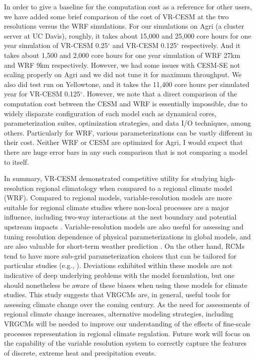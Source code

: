 \documentclass[draft,ms]{agutex}   %
\begin{document}
\begin{article}
In order to give a baseline for the computation cost as a reference for other users, we have added some brief comparison of the cost of VR-CESM at the two resolutions versus the WRF simulations. For our simulations on Agri (a cluster server at UC Davis), roughly, it takes about 15,000 and 25,000 core hours for one year simulation of VR-CESM 0.25$^\circ$ and VR-CESM 0.125$^\circ$ respectively. And it takes about 1,500 and 2,000 core hours for one year simulation of WRF 27km and WRF 9km respectively. However, we had some issues with CESM-SE not scaling properly on Agri and we did not tune it for maximum throughput. We also did test run on Yellowtone, and it takes the 11,400 core hours per simulated year for VR-CESM 0.125$^\circ$. However, we note that a direct comparison of the computation cost between the CESM and WRF is essentially impossible, due to widely disparate configuration of each model such as dynamical cores, parameterization suites, optimization strategies, and data I/O techniques, among others. Particularly for WRF, various parameterizations can be vastly different in their cost. Neither WRF or CESM are optimized for Agri, I would expect that there are huge error bars in any such comparison that is not comparing a model to itself.

In summary, VR-CESM demonstrated competitive utility for studying high-resolution regional climatology when compared to a regional climate model (WRF). Compared to regional models, variable-resolution models are more suitable for regional climate studies where non-local processes are a major influence, including two-way interactions at the nest boundary and potential upstream impacts \citep{sakaguchi2015exploring}.  Variable-resolution models are also useful for assessing and tuning resolution dependence of physical parameterizations in global models, and are also valuable for short-term weather prediction \citep{zarzycki2015experimental}. On the other hand, RCMs tend to have more sub-grid parameterization choices that can be tailored for particular studies (e.g., \citep{cassano2011performance}). Deviations exhibited within these models are not indicative of deep underlying problems with the model formulation, but one should nonetheless be aware of these biases when using these models for climate studies. This study suggests that VRGCMs are, in general, useful tools for assessing climate change over the coming century. As the need for assessments of regional climate change increases, alternative modeling strategies, including VRGCMs will be needed to improve our understanding of the effects of fine-scale processes representation in regional climate regulation. Future work will focus on the capability of the variable resolution system to correctly capture the features of discrete, extreme heat and precipitation events.




\end{article}
\end{document}
